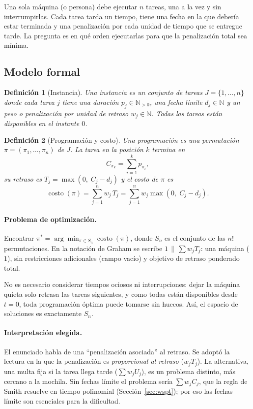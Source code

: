 \documentclass[10pt,twocolumn,letterpaper]{article}
\newtheorem{definicion}{Definición}
\newcommand{\costo}{\operatorname{costo}}
\newcommand{\N}{\mathbb{N}}
\begin{document}
Una sola máquina (o persona) debe ejecutar $n$ tareas, una a la vez y sin
interrumpirlas. Cada tarea tarda un tiempo, tiene una fecha en la que debería
estar terminada y una penalización por cada unidad de tiempo que se entregue
tarde. La pregunta es en qué orden ejecutarlas para que la penalización total
sea mínima.

\subsection{Modelo formal}

\begin{definicion}[Instancia]
Una instancia es un conjunto de tareas $J=\{1,\dots,n\}$ donde cada tarea $j$
tiene una \emph{duración} $p_j\in\N_{>0}$, una \emph{fecha límite}
$d_j\in\N$ y un \emph{peso} o penalización por unidad de retraso
$w_j\in\N$. Todas las tareas están disponibles en el instante $0$.
\end{definicion}

\begin{definicion}[Programación y costo]
Una programación es una permutación $\pi=(\pi_1,\dots,\pi_n)$ de $J$. La tarea
en la posición $k$ termina en
\[
C_{\pi_k} = \sum_{i=1}^{k} p_{\pi_i},
\]
su \emph{retraso} es $T_j=\max(0,\;C_j-d_j)$ y el costo de $\pi$ es
\[
\costo(\pi)=\sum_{j=1}^{n} w_j\,T_j=\sum_{j=1}^{n} w_j\max(0,\;C_j-d_j).
\]
\end{definicion}

\paragraph{Problema de optimización.} Encontrar
$\pi^\ast=\arg\min_{\pi\in S_n}\costo(\pi)$, donde $S_n$ es el conjunto de las
$n!$ permutaciones. En la notación de Graham se escribe
$1\,\|\,\sum w_jT_j$: una máquina ($1$), sin restricciones adicionales
(campo vacío) y objetivo de retraso ponderado total.

No es necesario considerar tiempos ociosos ni interrupciones: dejar la máquina
quieta solo retrasa las tareas siguientes, y como todas están disponibles desde
$t=0$, toda programación óptima puede tomarse sin huecos. Así, el espacio de
soluciones es exactamente $S_n$.

\paragraph{Interpretación elegida.} El enunciado habla de una ``penalización
asociada'' al retraso. Se adoptó la lectura en la que la penalización es
\emph{proporcional al retraso} ($w_jT_j$). La alternativa, una multa fija si la
tarea llega tarde ($\sum w_jU_j$), es un problema distinto, más cercano a la
mochila. Sin fechas límite el problema sería $\sum w_jC_j$, que la regla de
Smith resuelve en tiempo polinomial (Sección~\ref{sec:wspt}); por eso las
fechas límite son esenciales para la dificultad.
\end{document}
